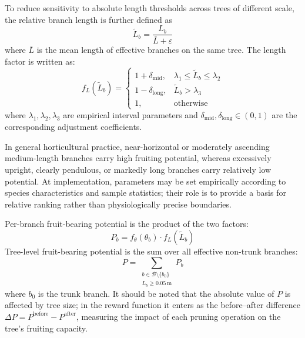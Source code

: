 \documentclass[12pt,a4paper,fontset=fandol]{ctexart}
\begin{document}
To reduce sensitivity to absolute length thresholds across trees of different scale,
the relative branch length is further defined as
\begin{equation}\label{eq:length_norm}
  \tilde{L}_b = \frac{L_b}{\bar{L} + \varepsilon}
\end{equation}
where $\bar{L}$ is the mean length of effective branches on the same tree.
The length factor is written as:
\begin{equation}\label{eq:length_factor}
  f_L(\tilde{L}_b) =
  \begin{cases}
    1 + \delta_{\text{mid}}, & \lambda_1 \leq \tilde{L}_b \leq \lambda_2 \\
    1 - \delta_{\text{long}}, & \tilde{L}_b > \lambda_3 \\
    1, & \text{otherwise}
  \end{cases}
\end{equation}
where $\lambda_1,\lambda_2,\lambda_3$ are empirical interval parameters
and $\delta_{\text{mid}}, \delta_{\text{long}} \in (0,1)$ are the corresponding adjustment coefficients.

In general horticultural practice,
near-horizontal or moderately ascending medium-length branches carry high fruiting potential,
whereas excessively upright, clearly pendulous, or markedly long branches carry relatively low potential.
At implementation, parameters may be set empirically according to species characteristics and sample statistics;
their role is to provide a basis for relative ranking rather than physiologically precise boundaries.

Per-branch fruit-bearing potential is the product of the two factors:
\begin{equation}\label{eq:branch_potential}
  P_b = f_\theta(\theta_b) \cdot f_L(\tilde{L}_b)
\end{equation}
Tree-level fruit-bearing potential is the sum over all effective non-trunk branches:
\begin{equation}\label{eq:total_potential}
  P = \sum_{\substack{b \in \mathcal{B} \setminus \{b_0\} \\ L_b \geq 0.05\,\text{m}}} P_b
\end{equation}
where $b_0$ is the trunk branch.
It should be noted that the absolute value of $P$ is affected by tree size;
in the reward function it enters as the before--after difference $\Delta P = P^{\mathrm{before}} - P^{\mathrm{after}}$,
measuring the impact of each pruning operation on the tree's fruiting capacity.
\end{document}
